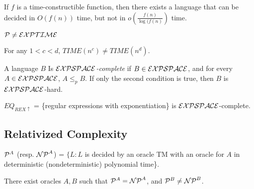 \begin{theorem}
If $f$ is a time-constructible function, then there exists a language that can be decided in $O(f(n))$ time, but not in $o(\frac{f(n)}{\log(f(n)})$ time.
\end{theorem}

\begin{corollary}
$\mathcal{P} \ne \mathcal{EXPTIME}$
\end{corollary}

\begin{corollary}
For any $1 < c < d$, $TIME(n^c) \ne TIME(n^d)$.
\end{corollary}

\begin{definition}
A language $B$ Is \emph{$\mathcal{EXPSPACE}$-complete} if $B \in \mathcal{EXPSPACE}$, and for every $A \in \mathcal{EXPSPACE}$, $A \le_p B$. If only the second condition is true, then $B$ is $\mathcal{EXPSPACE}$-hard.
\end{definition}

\begin{theorem}
$EQ_{REX\uparrow}$ = \{regular expressions with exponentiation\} is $\mathcal{EXPSPACE}$-complete.
\end{theorem}

\subsection{Relativized Complexity}

\begin{definition}
$\mathcal{P}^A$ (resp. $\mathcal{NP}^A$) = $\{L : L$ is decided by an oracle TM with an oracle for $A$ in deterministic (nondeterministic) polynomial time\}.
\end{definition}

\begin{theorem}
There exist oracles $A, B$ such that $\mathcal{P}^A = \mathcal{NP}^A$, and $\mathcal{P}^B \ne \mathcal{NP}^B$.
\end{theorem}